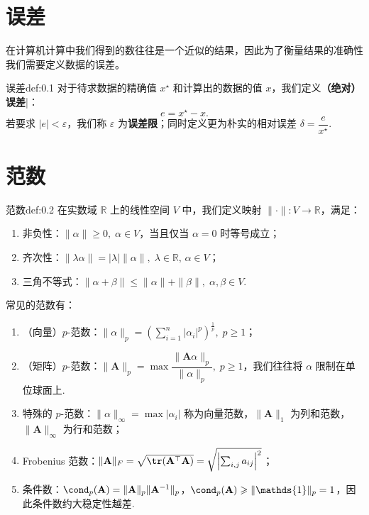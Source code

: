 \section{误差}
在计算机计算中我们得到的数往往是一个近似的结果，因此为了衡量结果的准确性我们需要定义数据的误差。
\begin{definition}{误差}{def:0.1}
    对于待求数据的精确值 $x^\star$ 和计算出的数据的值 $x$，我们定义{\bf （绝对）误差}|：
    \[
        e = x^\star - x.
    \]
    若要求 $|e|<\varepsilon$，我们称 $\varepsilon$ 为{\bf 误差限}；同时定义更为朴实的相对误差 $\delta = \dfrac{e}{x^\star}$.
\end{definition}

\section{范数}
\begin{definition}{范数}{def:0.2}
    在实数域 $\mathbb{R}$ 上的线性空间 $V$ 中，我们定义映射 $\| \cdot \| :V\to \mathbb{R}$，满足：
    \begin{enumerate}
        \item 非负性：$\|\alpha\| \geqslant 0,\; \alpha \in V$，当且仅当 $\alpha =0$ 时等号成立；
        \item 齐次性：$\|\lambda \alpha\| =|\lambda|\|\alpha \|,\; \lambda \in \mathbb{R},\, \alpha \in V$；
        \item 三角不等式：$\|\alpha+\beta\|\leqslant \|\alpha\|+\|\beta\|,\; \alpha,\beta \in V$.
    \end{enumerate}
\end{definition}

常见的范数有：
\begin{enumerate}
    \item （向量）$p$-范数：$\|\alpha\|_p = \left(\sum_{i=1}^n |\alpha_i|^p\right)^{\frac{1}{p}},\; p\geqslant 1$；
    \item （矩阵）$p$-范数：$\|\mathbf{A}\|_p = \max\dfrac{\|\mathbf{A}\alpha\|_p}{\|\alpha\|_p},\; p\geqslant 1$，我们往往将 $\alpha$ 限制在单位球面上.
    \item 特殊的 $p$-范数：$\|\alpha\|_{\infty} = \max |\alpha_i|$ 称为向量范数，$\|\mathbf{A}\|_1 $ 为列和范数，$\|\mathbf{A}\|_\infty$ 为行和范数；
    \item Frobenius 范数：$\|\mathbf{A}\|_F = \sqrt{\tr(\mathbf{A}^\top\mathbf{A})} = \sqrt{\left|\sum_{i,j} a_{ij}\right|^2}$；
    \item 条件数：$\cond_p (\mathbf{A} ) = \|\mathbf{A}\|_p \|\mathbf{A}^{-1}\|_p$，$\cond_p (\mathbf{A}) \geqslant \|\mathds{1}\|_p= 1$，因此条件数约大稳定性越差.
\end{enumerate}

